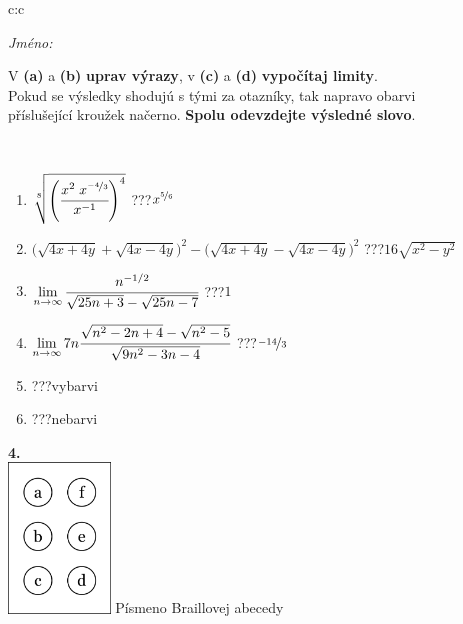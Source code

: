 \documentclass[10pt]{report}
\begin{document}
\begin{tabular}{c:c}
\begin{minipage}[c][104.5mm][t]{0.5\linewidth}
\begin{center}
\textit{Jméno:}\phantom{xxxxxxxxxxxxxxxxxxxxxxxxxxxxxxxxxxxxxxxxxxxxxxxxxxxxxxxxxxxxxxxxx}\\[5mm]
\begin{minipage}{0.95\linewidth}
\begin{center}
V \textbf{(a)} a \textbf{(b)} \textbf{uprav výrazy}, v \textbf{(c)} a \textbf{(d)} \textbf{vypočítaj limity}.\\Pokud se výsledky shodujú s tými za otazníky, tak napravo obarvi\\příslušející kroužek načerno. \textbf{Spolu odevzdejte výsledné slovo}.
\end{center}
\end{minipage}
\\[1mm]
\begin{minipage}{0.79\linewidth}
\begin{center}
\begin{varwidth}{\linewidth}
\begin{enumerate}
\small
\item $\sqrt[8]{\left(\cfrac{x^{2}\;x^{\nicefrac{-4}{3}}}{x^{-1}}\right)^{4}}$\quad \dotfill\; ???\;\dotfill \quad $x^{\nicefrac{5}{6}}$
\item {\footnotesize{\scriptsize$\big(\sqrt{4x+4y}+\sqrt{4x-4y}\big)^2-\big(\sqrt{4x+4y}-\sqrt{4x-4y}\big)^2$}\quad \dotfill\; ???\;\dotfill \quad $16\sqrt{x^2-y^2}$}
\item $\lim\limits_{n\to\infty}\cfrac{n^{-1/2}}{\sqrt{25n+3}-\sqrt{25n-7}}$\quad \dotfill\; ???\;\dotfill \quad $1$
\item $\lim\limits_{n\to\infty}7n\cfrac{\sqrt{n^2-2n+4}-\sqrt{n^2-5}}{\sqrt{9n^2-3n-4}}$\quad \dotfill\; ???\;\dotfill \quad $\nicefrac{-14}{3}$
\item \quad \dotfill\; ???\;\dotfill \quad vybarvi
\item \quad \dotfill\; ???\;\dotfill \quad nebarvi
\end{enumerate}
\end{varwidth}
\end{center}
\end{minipage}
\begin{minipage}{0.20\linewidth}
\begin{center}
{\Huge\bfseries 4.} \\[2mm]
\includegraphics[height=40mm]{../images/braille.png}
{\small Písmeno Braillovej abecedy}
\end{center}
\end{minipage}
\end{center}
\end{minipage}
%
\end{tabular}
\end{document}
